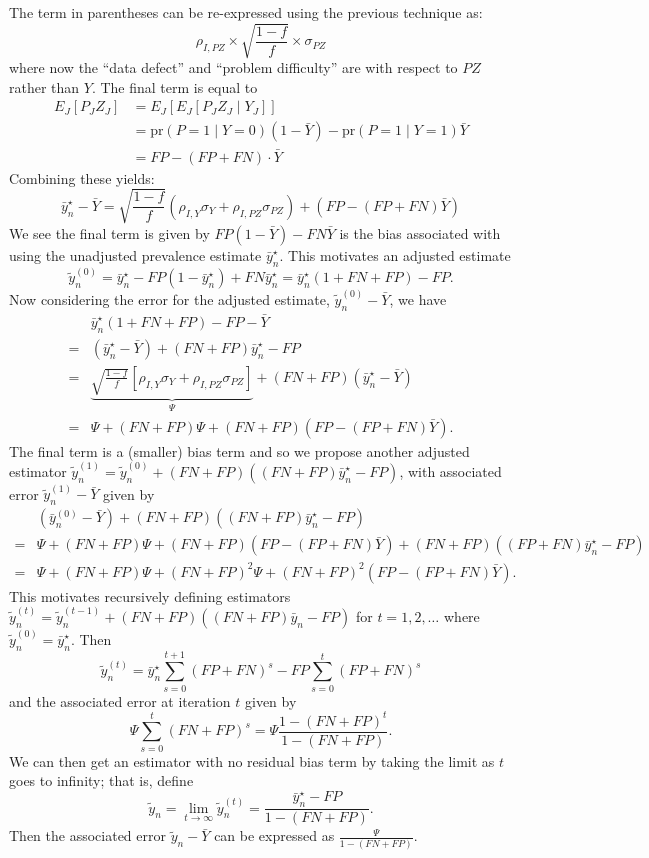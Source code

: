 \documentclass[12pt]{article}
\def\pr{\text{pr}}
\begin{document}
The term in parentheses can be re-expressed using the previous technique as:
$$
\rho_{I, PZ} \times \sqrt{\frac{1-f}{f}} \times \sigma_{PZ}
$$
where now the ``data defect'' and ``problem difficulty'' are with respect to $PZ$ rather than $Y$. The final term is equal to
$$
\begin{aligned}
E_J [P_J Z_J ] &= E_J [ E_J [ P_J Z_J \mid Y_J ] ] \\
&= \pr (P = 1 \mid Y = 0) (1-\bar Y) - \pr(P=1 \mid Y = 1) \bar Y \\
&= FP - (FP + FN) \cdot \bar Y
\end{aligned}
$$
Combining these yields:
$$
\bar y_n^\star - \bar Y = \sqrt{\frac{1-f}{f}} \left(\rho_{I,Y} \sigma_Y + \rho_{I, PZ} \sigma_{PZ} \right) + \left( FP - (FP+FN) \bar Y \right)
$$
We see the final term is given by $FP (1-\bar Y) - FN \bar Y$ is the bias associated with using the unadjusted prevalence estimate $\bar y_n^\star$.  This motivates an adjusted estimate
$$
\tilde y_n^{(0)} = \bar y_n^\star - FP (1- \bar y_n^\star ) + FN \bar y_n^\star
= \bar y_n^\star (1 + FN + FP) - FP.
$$
Now considering the error for the adjusted estimate, $\tilde y_n^{(0)} - \bar Y$, we have
$$
\begin{aligned}
 &\bar y_n^\star (1 + FN + FP) - FP - \bar Y \\
 =&(\bar y_n^\star - \bar Y) +  (FN + FP) \bar y_n^\star - FP  \\
 =&\underbrace{\sqrt{\frac{1-f}{f}} \left[\rho_{I,Y} \sigma_Y + \rho_{I, PZ} \sigma_{PZ} \right]}_{\Psi} + (  FN + FP ) (\bar y_n^\star -  \bar Y) \\
 =& \Psi + (FN + FP) \Psi + (FN + FP) (FP - (FP+FN) \bar Y).
 \end{aligned}
$$
The final term is a (smaller) bias term and so we propose another adjusted estimator $\tilde y_n^{(1)} = \tilde y_n^{(0)} + (FN+FP)  ( (FN+FP) \bar y_n^\star - FP)$, with associated error $\tilde y_n^{(1)} - \bar Y$ given by
$$
\begin{aligned}
 &(\bar y_n^{(0)} - \bar Y) + (FN+FP)  ( (FN+FP) \bar y_n^\star - FP)\\
 =&\Psi + (FN + FP) \Psi + (FN + FP) (FP - (FP+FN) \bar Y) + (FN + FP) ((FP+FN) \bar y_n^\star - FP)  \\
  =& \Psi + (FN + FP) \Psi + (FN + FP)^2 \Psi + (FN+FP)^2 (FP - (FP+FN) \bar Y).
 \end{aligned}
$$
This motivates recursively defining estimators $\tilde y_n^{(t)} = \tilde y_n^{(t-1)} + (FN+FP)  ( (FN+FP) \bar y_n - FP)$ for $t=1,2,\ldots$ where $\tilde y_n^{(0)} = \bar y_n^\star$.  Then
$$
\tilde y_n^{(t)} = \bar y_n^\star \sum_{s=0}^{t+1} (FP+FN)^s - FP \sum_{s=0}^{t} (FP+FN)^s
$$
and the associated error at iteration $t$ given by
$$
\Psi \sum_{s=0}^t (FN+FP)^s = \Psi \frac{1 - (FN+FP)^t}{1 - (FN+FP)}.
$$
We can then get an estimator with no residual bias term by taking the limit as $t$ goes to infinity; that is, define
$$
\tilde y_n = \lim_{t \to \infty} \tilde y_n^{(t)} = \frac{\bar y_n^\star - FP}{1 -(FN+FP)}.
$$
Then the associated error $\tilde y_n - \bar Y$ can be expressed as $\frac{\Psi}{1-(FN+FP)}$.
\end{document}
